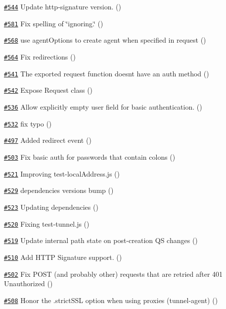 \begin{DoxyItemize}
\item \href{https://github.com/request/request/pull/544}{\tt \#544} Update http-\/signature version. ()
\item \href{https://github.com/request/request/pull/581}{\tt \#581} Fix spelling of \char`\"{}ignoring.\char`\"{} ()
\item \href{https://github.com/request/request/pull/568}{\tt \#568} use agent\+Options to create agent when specified in request ()
\item \href{https://github.com/request/request/pull/564}{\tt \#564} Fix redirections ()
\item \href{https://github.com/request/request/pull/541}{\tt \#541} The exported request function doesn\textquotesingle{}t have an auth method ()
\item \href{https://github.com/request/request/pull/542}{\tt \#542} Expose Request class ()
\item \href{https://github.com/request/request/pull/536}{\tt \#536} Allow explicitly empty user field for basic authentication. ()
\item \href{https://github.com/request/request/pull/532}{\tt \#532} fix typo ()
\item \href{https://github.com/request/request/pull/497}{\tt \#497} Added redirect event ()
\item \href{https://github.com/request/request/pull/503}{\tt \#503} Fix basic auth for passwords that contain colons ()
\item \href{https://github.com/request/request/pull/521}{\tt \#521} Improving test-\/local\+Address.\+js ()
\item \href{https://github.com/request/request/pull/529}{\tt \#529} dependencies versions bump ()
\item \href{https://github.com/request/request/pull/523}{\tt \#523} Updating dependencies ()
\item \href{https://github.com/request/request/pull/520}{\tt \#520} Fixing test-\/tunnel.\+js ()
\item \href{https://github.com/request/request/pull/519}{\tt \#519} Update internal path state on post-\/creation QS changes ()
\item \href{https://github.com/request/request/pull/510}{\tt \#510} Add H\+T\+TP Signature support. ()
\item \href{https://github.com/request/request/pull/502}{\tt \#502} Fix P\+O\+ST (and probably other) requests that are retried after 401 Unauthorized ()
\item \href{https://github.com/request/request/pull/508}{\tt \#508} Honor the .strict\+S\+SL option when using proxies (tunnel-\/agent) ()

\end{DoxyItemize}
